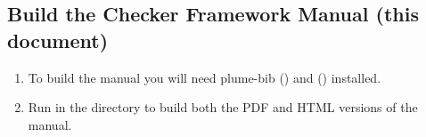 \subsection{Build the Checker Framework Manual (this document)}

\begin{enumerate}
\item
To build the manual you will need plume-bib () and {\hevea} () installed.

\item
Run  in the  directory to build both the PDF and HTML versions of the manual.
\end{enumerate}





% 
% 
% 

